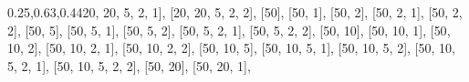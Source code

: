 \documentclass[
  paper=a4,
  ,captions=tableheading
]{scrartcl}
\newenvironment{Shaded}{}{}
\newcommand{\DecValTok}[1]{\textcolor[rgb]{0.25,0.63,0.44}{#1}}
\newcommand{\NormalTok}[1]{#1}
\begin{document}
\begin{Shaded}
\begin{Highlighting}[]
\NormalTok{    [}\DecValTok{20}\NormalTok{, }\DecValTok{20}\NormalTok{, }\DecValTok{5}\NormalTok{, }\DecValTok{2}\NormalTok{, }\DecValTok{1}\NormalTok{],}
\NormalTok{    [}\DecValTok{20}\NormalTok{, }\DecValTok{20}\NormalTok{, }\DecValTok{5}\NormalTok{, }\DecValTok{2}\NormalTok{, }\DecValTok{2}\NormalTok{],}
\NormalTok{    [}\DecValTok{50}\NormalTok{],}
\NormalTok{    [}\DecValTok{50}\NormalTok{, }\DecValTok{1}\NormalTok{],}
\NormalTok{    [}\DecValTok{50}\NormalTok{, }\DecValTok{2}\NormalTok{],}
\NormalTok{    [}\DecValTok{50}\NormalTok{, }\DecValTok{2}\NormalTok{, }\DecValTok{1}\NormalTok{],}
\NormalTok{    [}\DecValTok{50}\NormalTok{, }\DecValTok{2}\NormalTok{, }\DecValTok{2}\NormalTok{],}
\NormalTok{    [}\DecValTok{50}\NormalTok{, }\DecValTok{5}\NormalTok{],}
\NormalTok{    [}\DecValTok{50}\NormalTok{, }\DecValTok{5}\NormalTok{, }\DecValTok{1}\NormalTok{],}
\NormalTok{    [}\DecValTok{50}\NormalTok{, }\DecValTok{5}\NormalTok{, }\DecValTok{2}\NormalTok{],}
\NormalTok{    [}\DecValTok{50}\NormalTok{, }\DecValTok{5}\NormalTok{, }\DecValTok{2}\NormalTok{, }\DecValTok{1}\NormalTok{],}
\NormalTok{    [}\DecValTok{50}\NormalTok{, }\DecValTok{5}\NormalTok{, }\DecValTok{2}\NormalTok{, }\DecValTok{2}\NormalTok{],}
\NormalTok{    [}\DecValTok{50}\NormalTok{, }\DecValTok{10}\NormalTok{],}
\NormalTok{    [}\DecValTok{50}\NormalTok{, }\DecValTok{10}\NormalTok{, }\DecValTok{1}\NormalTok{],}
\NormalTok{    [}\DecValTok{50}\NormalTok{, }\DecValTok{10}\NormalTok{, }\DecValTok{2}\NormalTok{],}
\NormalTok{    [}\DecValTok{50}\NormalTok{, }\DecValTok{10}\NormalTok{, }\DecValTok{2}\NormalTok{, }\DecValTok{1}\NormalTok{],}
\NormalTok{    [}\DecValTok{50}\NormalTok{, }\DecValTok{10}\NormalTok{, }\DecValTok{2}\NormalTok{, }\DecValTok{2}\NormalTok{],}
\NormalTok{    [}\DecValTok{50}\NormalTok{, }\DecValTok{10}\NormalTok{, }\DecValTok{5}\NormalTok{],}
\NormalTok{    [}\DecValTok{50}\NormalTok{, }\DecValTok{10}\NormalTok{, }\DecValTok{5}\NormalTok{, }\DecValTok{1}\NormalTok{],}
\NormalTok{    [}\DecValTok{50}\NormalTok{, }\DecValTok{10}\NormalTok{, }\DecValTok{5}\NormalTok{, }\DecValTok{2}\NormalTok{],}
\NormalTok{    [}\DecValTok{50}\NormalTok{, }\DecValTok{10}\NormalTok{, }\DecValTok{5}\NormalTok{, }\DecValTok{2}\NormalTok{, }\DecValTok{1}\NormalTok{],}
\NormalTok{    [}\DecValTok{50}\NormalTok{, }\DecValTok{10}\NormalTok{, }\DecValTok{5}\NormalTok{, }\DecValTok{2}\NormalTok{, }\DecValTok{2}\NormalTok{],}
\NormalTok{    [}\DecValTok{50}\NormalTok{, }\DecValTok{20}\NormalTok{],}
\NormalTok{    [}\DecValTok{50}\NormalTok{, }\DecValTok{20}\NormalTok{, }\DecValTok{1}\NormalTok{],}

\end{Highlighting}
\end{Shaded}
\end{document}
